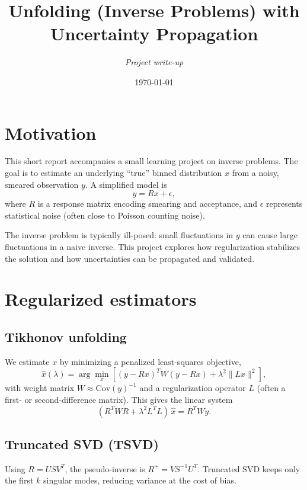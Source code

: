 \documentclass[11pt,a4paper]{article}
\title{Unfolding (Inverse Problems) with Uncertainty Propagation}
\author{\textit{Project write-up}}
\date{\today}
\begin{document}
\maketitle

\section{Motivation}
This short report accompanies a small learning project on inverse problems.
The goal is to estimate an underlying ``true'' binned distribution $x$ from a noisy, smeared observation $y$.
A simplified model is
\begin{equation}
  y = R x + \epsilon,
\end{equation}
where $R$ is a response matrix encoding smearing and acceptance, and $\epsilon$ represents statistical noise (often close to Poisson counting noise).

The inverse problem is typically ill-posed: small fluctuations in $y$ can cause large fluctuations in a naive inverse.
This project explores how regularization stabilizes the solution and how uncertainties can be propagated and validated.

\section{Regularized estimators}

\subsection{Tikhonov unfolding}
We estimate $x$ by minimizing a penalized least-squares objective,
\begin{equation}
  \hat{x}(\lambda) = \arg\min_x \left[ (y - Rx)^T W (y - Rx) + \lambda^2 \lVert L x \rVert^2 \right],
\end{equation}
with weight matrix $W \approx \mathrm{Cov}(y)^{-1}$ and a regularization operator $L$ (often a first- or second-difference matrix).
This gives the linear system
\begin{equation}
  (R^T W R + \lambda^2 L^T L)\,\hat{x} = R^T W y.
\end{equation}

\subsection{Truncated SVD (TSVD)}
Using $R = U S V^T$, the pseudo-inverse is $R^+ = V S^{-1} U^T$. Truncated SVD keeps only the first $k$ singular modes,
reducing variance at the cost of bias.
\end{document}
